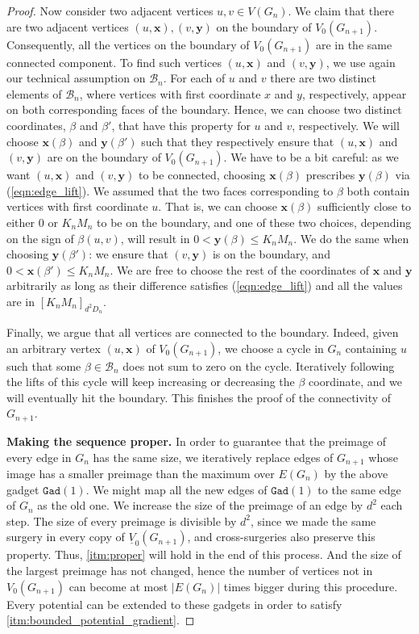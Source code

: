 \documentclass[10pt]{article}
\theoremstyle{plain}
\theoremstyle{remark}
\newcommand{\1}{\mathbbm{1}}
\numberwithin{equation}{section}
\begin{document}
\begin{proof}
Now consider two adjacent vertices $u,v \in V(G_n)$. We claim that there are two adjacent vertices $(u, \mathbf{x}),(v,\mathbf{y})$ on the boundary of $V_0(G_{n+1})$. Consequently, all the vertices on the boundary of $V_0(G_{n+1})$ are in the same connected component.   
To find such vertices $(u, \mathbf{x})$ and $(v,\mathbf{y})$, we use again our technical assumption on $\mathcal{B}_n$. For each of $u$ and $v$ there are two distinct elements of $\mathcal{B}_n$, where vertices with first coordinate $x$ and $y$, respectively, appear on both corresponding faces of the boundary. Hence, we can choose two distinct coordinates, $\beta$ and $\beta'$, that have this property for $u$ and $v$, respectively. We will choose $\mathbf{x}(\beta)$ and $\mathbf{y}(\beta')$ such that they respectively ensure that $(u, \mathbf{x})$ and $(v,\mathbf{y})$ are on the boundary of $V_0(G_{n+1})$. We have to be a bit careful: as we want $(u, \mathbf{x})$ and $(v,\mathbf{y})$ to be connected, choosing $\mathbf{x}(\beta)$ prescribes $\mathbf{y}(\beta)$ via (\ref{eqn:edge_lift}). We assumed that the two faces corresponding to $\beta$ both contain vertices with first coordinate $u$. That is, we can choose $\mathbf{x}(\beta)$ sufficiently close to either $0$ or $K_nM_n$ to be on the boundary, and one of these two choices, depending on the sign of $\beta(u,v)$, will result in $0 < \mathbf{y}(\beta) \leq K_nM_n$. We do the same when choosing $\mathbf{y}(\beta')$: we ensure that $(v,\mathbf{y})$ is on the boundary, and $0<\mathbf{x}(\beta')\leq K_nM_n$. We are free to choose the rest of the coordinates of $\mathbf{x}$ and $\mathbf{y}$ arbitrarily as long as their difference satisfies (\ref{eqn:edge_lift}) and all the values are in $[K_nM_n]_{d^2D_n}$.

Finally, we argue that all vertices are connected to the boundary. Indeed, given an arbitrary vertex $(u,\mathbf{x})$ of $V_0(G_{n+1})$, we choose a cycle in $G_n$ containing $u$ such that some $\beta \in \mathcal{B}_n$ does not sum to zero on the cycle. Iteratively following the lifts of this cycle will keep increasing or decreasing the $\beta$ coordinate, and we will eventually hit the boundary. This finishes the proof of the connectivity of $G_{n+1}$.

{\bf Making the sequence proper.} In order to guarantee that the preimage of every edge in $G_n$ has the same size, we iteratively replace edges of $G_{n+1}$ whose image has a smaller preimage than the maximum over $E(G_n)$ by the above gadget $\texttt{Gad}(1)$. We might map all the new edges of $\texttt{Gad}(1)$ to the same edge of $G_n$ as the old one. We increase the size of the preimage of an edge by $d^2$ each step. The size of every preimage is divisible by $d^2$, since we made the same surgery in every copy of $\underline{V}_0(G_{n+1})$, and cross-surgeries also preserve this property. Thus, \ref{itm:proper} will hold in the end of this process. And the size of the largest preimage has not changed, hence the number of vertices not in $V_0(G_{n+1})$ can become at most $|E(G_n)|$ times bigger during this procedure.
Every potential can be extended to these gadgets in order to satisfy \ref{itm:bounded_potential_gradient}.


\end{proof}
\end{document}
